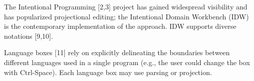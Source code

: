 The Intentional Programming [2,3] project has gained widespread visibility and has popularized projectional editing; the Intentional Domain Workbench (IDW) is the contemporary implementation of the approach.
IDW supports diverse notations [9,10].


Language boxes [11] rely on explicitly delineating the boundaries between different languages used in a single program (e.g., the user could change the box with Ctrl-Space).
Each language box may use parsing or projection.













